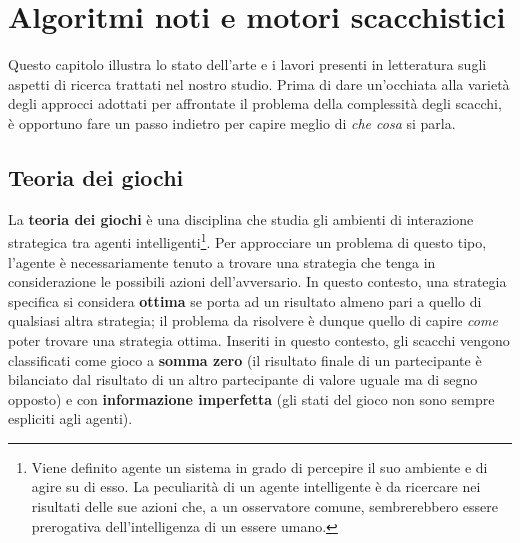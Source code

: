\chapter{Algoritmi noti e motori scacchistici} %
%
\begin{citazione}
    Questo capitolo illustra lo stato dell'arte e i lavori presenti in letteratura sugli aspetti di ricerca trattati nel nostro studio. 
    Prima di dare un'occhiata alla varietà degli approcci adottati per affrontate il problema della complessità degli scacchi, 
    è opportuno fare un passo indietro per capire meglio di \textit{che cosa} si parla.
\end{citazione}

\section{Teoria dei giochi}
La \textbf{teoria dei giochi} è una disciplina che studia gli ambienti di interazione strategica tra
agenti intelligenti\footnote{Viene definito agente un sistema in grado di percepire il suo ambiente e di agire su di esso. La peculiarità
di un agente intelligente è da ricercare nei risultati delle sue azioni che, a un osservatore comune, sembrerebbero essere prerogativa
dell'intelligenza di un essere umano.}. Per approcciare un problema di questo tipo, l'agente è necessariamente tenuto a trovare
una strategia che tenga in considerazione le possibili azioni dell'avversario. In questo contesto, una strategia specifica si considera
\textbf{ottima} se porta ad un risultato almeno pari a quello di qualsiasi altra strategia; il problema da risolvere è dunque 
quello di capire \textit{come} poter trovare una strategia ottima. Inseriti in questo contesto,
gli scacchi vengono classificati come gioco a \textbf{somma zero} (il risultato finale di un partecipante
è bilanciato dal risultato di un altro partecipante di valore uguale ma di segno opposto) e con \textbf{informazione imperfetta} (gli stati
del gioco non sono sempre espliciti agli agenti).

